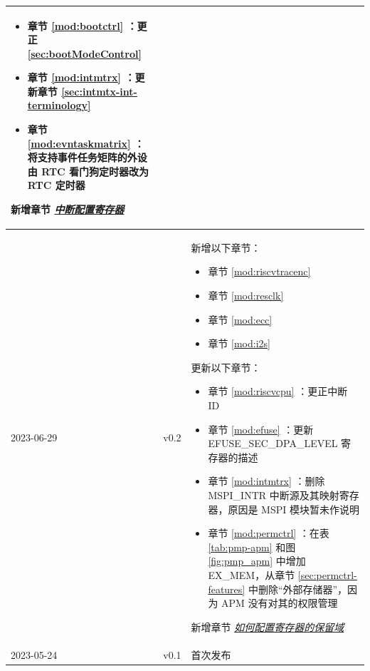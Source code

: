 \begin{longtable}[l]{ | m{2cm} | m{1.5cm} | m{12cm} | }
\begin{itemize}
        \item 章节 \ref{mod:bootctrl} \textit{\nameref{mod:bootctrl}}：更正 \ref{sec:bootModeControl} \textit{\nameref{sec:bootModeControl}}  %
        \item 章节 \ref{mod:intmtrx} \textit{\nameref{mod:intmtrx}}：更新章节 \ref{sec:intmtx-int-terminology} \textit{\nameref{sec:intmtx-int-terminology}} %
        \item 章节 \ref{mod:evntaskmatrix} \textit{\nameref{mod:evntaskmatrix}}：将支持事件任务矩阵的外设由 RTC 看门狗定时器改为 RTC 定时器 %
    \end{itemize}
    新增章节 \hyperref[interrupt-config-registers]{\textit{中断配置寄存器}}
    \\\hline
    2023-06-29        & v0.2 &
    新增以下章节：
    \begin{itemize}
        \item 章节 \ref{mod:riscvtracenc} \textit{\nameref{mod:riscvtracenc}}
        \item 章节 \ref{mod:resclk} \textit{\nameref{mod:resclk}}
        \item 章节 \ref{mod:ecc} \textit{\nameref{mod:ecc}}
        \item 章节 \ref{mod:i2s} \textit{\nameref{mod:i2s}}
    \end{itemize}
    更新以下章节：
    \begin{itemize}
        \item 章节 \ref{mod:riscvcpu} \textit{\nameref{mod:riscvcpu}}：更正中断 ID %
        \item 章节 \ref{mod:efuse} \textit{\nameref{mod:efuse}}：更新EFUSE\_SEC\_DPA\_LEVEL 寄存器的描述 %
        \item 章节 \ref{mod:intmtrx} \textit{\nameref{mod:intmtrx}}：删除 MSPI\_INTR 中断源及其映射寄存器，原因是 MSPI 模块暂未作说明 %
        \item 章节 \ref{mod:permctrl} \textit{\nameref{mod:permctrl}}：在表 \ref{tab:pmp-apm} 和图 \ref{fig:pmp_apm} 中增加 EX\_MEM，从章节 \ref{sec:permctrl-features} \textit{\nameref{sec:permctrl-features}} 中删除“外部存储器”，因为 APM 没有对其的权限管理
    \end{itemize}
    新增章节 \hyperref[programming-reserved-field]{\textit{如何配置寄存器的保留域}}
    \\\hline
    2023-05-24 & v0.1 & 首次发布\\\hline

\end{longtable}

